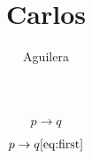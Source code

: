 \documentclass[a4paper]{article}
\title{Carlos}
\author{Aguilera}
\begin{document}
	\begin{align}
			p \to q \label{eq:first}
	\end{align}
	\begin{align}
			p \to q \label{eq:second}
			\label{eq:tercero}
			\ref{eq:first} 
	\end{align}
\end{document}
